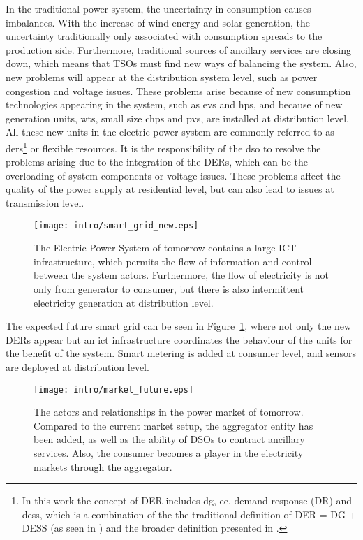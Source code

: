 In the traditional power system, the uncertainty in consumption causes imbalances. With the increase of wind energy and solar generation, the uncertainty traditionally only associated with consumption spreads to the production side. Furthermore, traditional sources of ancillary services are closing down, which means that TSOs must find new ways of balancing the system. Also, new problems will appear at the distribution system level, such as power congestion and voltage issues. These problems arise because of new consumption technologies appearing in the system, such as \glspl{ev} and \glspl{hp}, and because of new generation units, \eg \glspl{wt}, small size \glspl{chp} and \glspl{pv}, are installed at distribution level. All these new units in the electric power system are commonly referred to as \glspl{der}\footnote{In this work the concept of DER includes \gls{dg}, \gls{ee}, demand response (DR) and \gls{dess}, which is a combination of the the traditional definition of DER = DG + DESS (as seen in \eg \cite{nrel2002using}) and the broader definition presented in \cite{nys2014reforming}.} or flexible resources. It is the responsibility of the \gls{dso} to resolve the problems arising due to the integration of the DERs, which can be the overloading of system components or voltage issues. These problems affect the quality of the power supply at residential level, but can also lead to issues at transmission level.
\begin{figure}[ht]
	\centering
	\caption{The Electric Power System of tomorrow contains a large ICT infrastructure, which permits the flow of information and control between the system actors. Furthermore, the flow of electricity is not only from generator to consumer, but there is also intermittent electricity generation at distribution level.}
	\texttt{[image: intro/smart\_grid\_new.eps]}\label{fig:powerfuture}
\end{figure}

The expected future smart grid can be seen in Figure~\ref{fig:powerfuture}, where not only the new DERs appear but an \Gls{ict} infrastructure coordinates the behaviour of the units for the benefit of the system. Smart metering is added at consumer level, and sensors are deployed at distribution level.
\begin{figure*}[htbp!]
	\centering
	\caption{The actors and relationships in the power market of tomorrow. Compared to the current market setup, the aggregator entity has been added, as well as the ability of DSOs to contract ancillary services. Also, the consumer becomes a player in the electricity markets through the aggregator.}
	\texttt{[image: intro/market\_future.eps]}\label{fig:marketfuture}
\end{figure*}

